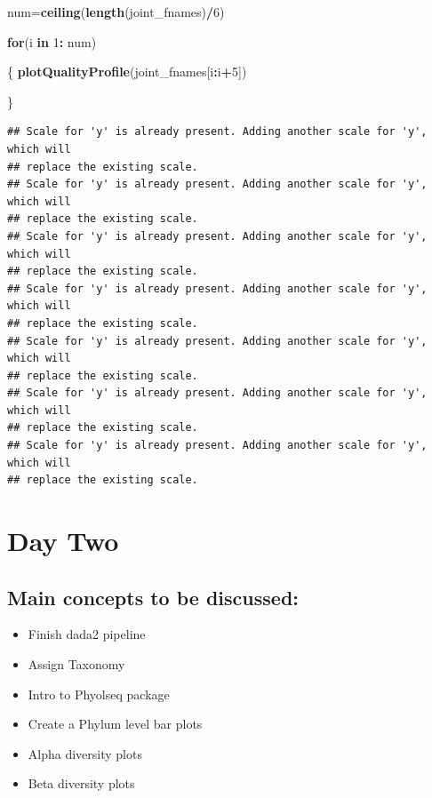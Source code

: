 \documentclass[
]{book}
\newenvironment{Shaded}{\begin{snugshade}}{\end{snugshade}}
\newcommand{\ControlFlowTok}[1]{\textcolor[rgb]{0.13,0.29,0.53}{\textbf{#1}}}
\newcommand{\DecValTok}[1]{\textcolor[rgb]{0.00,0.00,0.81}{#1}}
\newcommand{\KeywordTok}[1]{\textcolor[rgb]{0.13,0.29,0.53}{\textbf{#1}}}
\newcommand{\NormalTok}[1]{#1}
\newcommand{\OperatorTok}[1]{\textcolor[rgb]{0.81,0.36,0.00}{\textbf{#1}}}
\newcommand{\StringTok}[1]{\textcolor[rgb]{0.31,0.60,0.02}{#1}}
\providecommand{\tightlist}{%
  \setlength{\itemsep}{0pt}\setlength{\parskip}{0pt}}
\begin{document}
\begin{Shaded}
\begin{Highlighting}[]
\NormalTok{num=}\KeywordTok{ceiling}\NormalTok{(}\KeywordTok{length}\NormalTok{(joint_fnames)}\OperatorTok{/}\DecValTok{6}\NormalTok{)}

\ControlFlowTok{for}\NormalTok{(i }\ControlFlowTok{in} \DecValTok{1}\OperatorTok{:}\StringTok{ }\NormalTok{num)}

\NormalTok{\{}
  \KeywordTok{plotQualityProfile}\NormalTok{(joint_fnames[i}\OperatorTok{:}\NormalTok{i}\OperatorTok{+}\DecValTok{5}\NormalTok{])}


\NormalTok{\}}
\end{Highlighting}
\end{Shaded}

\begin{verbatim}
## Scale for 'y' is already present. Adding another scale for 'y', which will
## replace the existing scale.
## Scale for 'y' is already present. Adding another scale for 'y', which will
## replace the existing scale.
## Scale for 'y' is already present. Adding another scale for 'y', which will
## replace the existing scale.
## Scale for 'y' is already present. Adding another scale for 'y', which will
## replace the existing scale.
## Scale for 'y' is already present. Adding another scale for 'y', which will
## replace the existing scale.
## Scale for 'y' is already present. Adding another scale for 'y', which will
## replace the existing scale.
## Scale for 'y' is already present. Adding another scale for 'y', which will
## replace the existing scale.
\end{verbatim}

\hypertarget{day-two}{%
\chapter{Day Two}\label{day-two}}

\hypertarget{main-concepts-to-be-discussed}{%
\section{Main concepts to be discussed:}\label{main-concepts-to-be-discussed}}

\begin{itemize}
\tightlist
\item
  Finish dada2 pipeline
\item
  Assign Taxonomy
\item
  Intro to Phyolseq package
\item
  Create a Phylum level bar plots
\item
  Alpha diversity plots
\item
  Beta diversity plots
\end{itemize}
\end{document}
